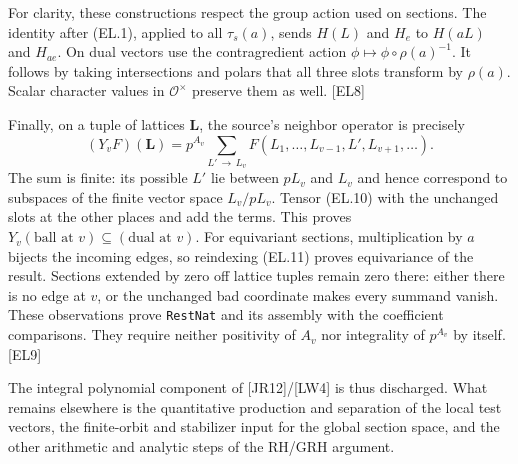 For clarity, these constructions respect the group action used on sections.
The identity after (EL.1), applied to all $\tau_s(a)$, sends $H(L)$ and $H_e$ to $H(aL)$ and $H_{ae}$.
On dual vectors use the contragredient action $\phi\mapsto\phi\circ\rho(a)^{-1}$.
It follows by taking intersections and polars that all three slots transform by $\rho(a)$.
Scalar character values in $\mathcal O^\times$ preserve them as well. \textsf{[EL8]}

Finally, on a tuple of lattices $\mathbf L$, the source's neighbor operator is precisely
\[
 (Y_vF)(\mathbf L)
  =p^{A_v}\sum_{L'\,\to\, L_v}
       F(L_1,\ldots,L_{v-1},L',L_{v+1},\ldots).
 \tag{EL.11}
\]
The sum is finite: its possible $L'$ lie between $pL_v$ and $L_v$ and hence correspond to subspaces of the finite vector space $L_v/pL_v$.
Tensor (EL.10) with the unchanged slots at the other places and add the terms. This proves
$Y_v(\text{ball at }v)\subseteq(\text{dual at }v)$.
For equivariant sections, multiplication by $a$ bijects the incoming edges, so reindexing (EL.11) proves equivariance of the result. Sections extended by zero off lattice tuples remain zero there: either there is no edge at $v$, or the unchanged bad coordinate makes every summand vanish.
These observations prove \texttt{RestNat} and its assembly with the coefficient comparisons. They require neither positivity of $A_v$ nor integrality of $p^{A_v}$ by itself. \textsf{[EL9]}

The integral polynomial component of [JR12]/[LW4] is thus discharged. What remains elsewhere is the quantitative production and separation of the local test vectors, the finite-orbit and stabilizer input for the global section space, and the other arithmetic and analytic steps of the RH/GRH argument.
